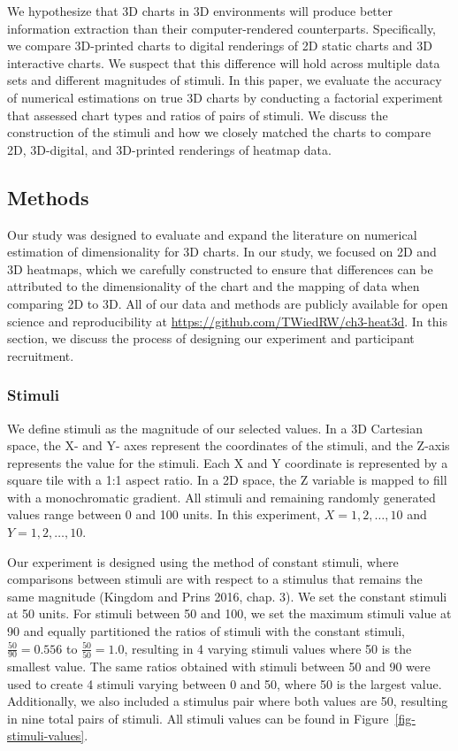 \documentclass[
  letterpaper,
  DIV=11,
  numbers=noendperiod]{scrartcl}
\begin{document}
We hypothesize that 3D charts in 3D environments will produce better
information extraction than their computer-rendered counterparts.
Specifically, we compare 3D-printed charts to digital renderings of 2D
static charts and 3D interactive charts. We suspect that this difference
will hold across multiple data sets and different magnitudes of stimuli.
In this paper, we evaluate the accuracy of numerical estimations on true
3D charts by conducting a factorial experiment that assessed chart types
and ratios of pairs of stimuli. We discuss the construction of the
stimuli and how we closely matched the charts to compare 2D, 3D-digital,
and 3D-printed renderings of heatmap data.

\subsection{Methods}\label{methods}

Our study was designed to evaluate and expand the literature on
numerical estimation of dimensionality for 3D charts. In our study, we
focused on 2D and 3D heatmaps, which we carefully constructed to ensure
that differences can be attributed to the dimensionality of the chart
and the mapping of data when comparing 2D to 3D. All of our data and
methods are publicly available for open science and reproducibility at
\url{https://github.com/TWiedRW/ch3-heat3d}. In this section, we discuss
the process of designing our experiment and participant recruitment.

\subsubsection{Stimuli}\label{stimuli}

We define stimuli as the magnitude of our selected values. In a 3D
Cartesian space, the X- and Y- axes represent the coordinates of the
stimuli, and the Z-axis represents the value for the stimuli. Each X and
Y coordinate is represented by a square tile with a 1:1 aspect ratio. In
a 2D space, the Z variable is mapped to fill with a monochromatic
gradient. All stimuli and remaining randomly generated values range
between 0 and 100 units. In this experiment, \(X=1, 2, \dots,10\) and
\(Y=1, 2,\dots,10\).

Our experiment is designed using the method of constant stimuli, where
comparisons between stimuli are with respect to a stimulus that remains
the same magnitude (Kingdom and Prins 2016, chap. 3). We set the
constant stimuli at 50 units. For stimuli between 50 and 100, we set the
maximum stimuli value at 90 and equally partitioned the ratios of
stimuli with the constant stimuli, \(\frac{50}{90}=0.556\) to
\(\frac{50}{50}=1.0\), resulting in 4 varying stimuli values where 50 is
the smallest value. The same ratios obtained with stimuli between 50 and
90 were used to create 4 stimuli varying between 0 and 50, where 50 is
the largest value. Additionally, we also included a stimulus pair where
both values are 50, resulting in nine total pairs of stimuli. All
stimuli values can be found in Figure~\ref{fig-stimuli-values}.
\end{document}
